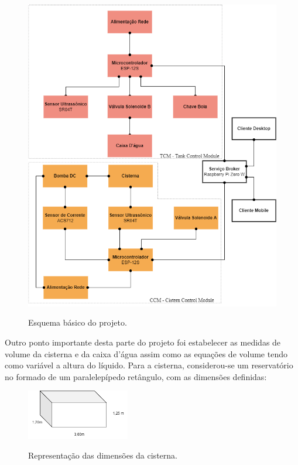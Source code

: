 \begin{figure}[H]
	\centering
	\caption{Esquema básico do projeto.}
	\includegraphics[width=1\textwidth]{figuras/esquema_basico_proj_2.png}
	\label{fig:esquema_proj}
\end{figure}

Outro ponto importante desta parte do projeto foi estabelecer as medidas de volume da cisterna e da caixa d'água assim como as equações de volume tendo como variável a altura do líquido. Para a cisterna, considerou-se um reservatório no formado de um paralelepípedo retângulo, com as dimensões definidas:

\begin{figure}[H]
	\centering
	\caption{Representação das dimensões da cisterna.}
	\includegraphics[width=0.4\textwidth]{figuras/volume.png}
	\label{fig:volume_cisterna}
\end{figure}

